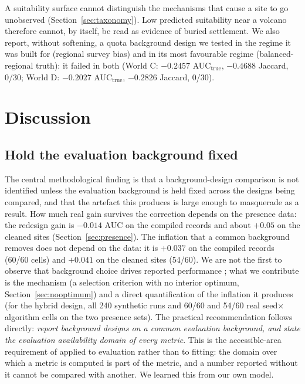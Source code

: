 \documentclass[12pt]{article}
\begin{document}
A suitability surface cannot distinguish the mechanisms that cause a site to go unobserved (Section~\ref{sec:taxonomy}).
Low predicted suitability near a volcano therefore cannot, by itself, be read as evidence of buried settlement.
We also report, without softening, a quota background design we tested in the regime it was built for (regional survey bias) and in its most favourable regime (balanced-regional truth): it failed in both (World C: $-0.2457$ AUC$_{\text{true}}$, $-0.4688$ Jaccard, 0/30; World D: $-0.2027$ AUC$_{\text{true}}$, $-0.2826$ Jaccard, 0/30).

\section{Discussion}

\subsection{Hold the evaluation background fixed}

The central methodological finding is that a background-design comparison is not identified unless the evaluation background is held fixed across the designs being compared, and that the artefact this produces is large enough to masquerade as a result.
How much real gain survives the correction depends on the presence data: the redesign gain is $-0.014$ AUC on the compiled records and about $+0.05$ on the cleaned sites (Section~\ref{sec:presence}).
The inflation that a common background removes does not depend on the data: it is $+0.037$ on the compiled records (60/60 cells) and $+0.041$ on the cleaned sites (54/60).
We are not the first to observe that background choice drives reported performance \citep{phillips2009, lobo2008, hijmans2012}; what we contribute is the mechanism (a selection criterion with no interior optimum, Section~\ref{sec:nooptimum}) and a direct quantification of the inflation it produces (for the hybrid design, all 240 synthetic runs and 60/60 and 54/60 real seed$\times$algorithm cells on the two presence sets).
The practical recommendation follows directly: \emph{report background designs on a common evaluation background, and state the evaluation availability domain of every metric}.
This is the accessible-area requirement of \citet{barve2011} applied to evaluation rather than to fitting: the domain over which a metric is computed is part of the metric, and a number reported without it cannot be compared with another.
We learned this from our own model.
\end{document}
